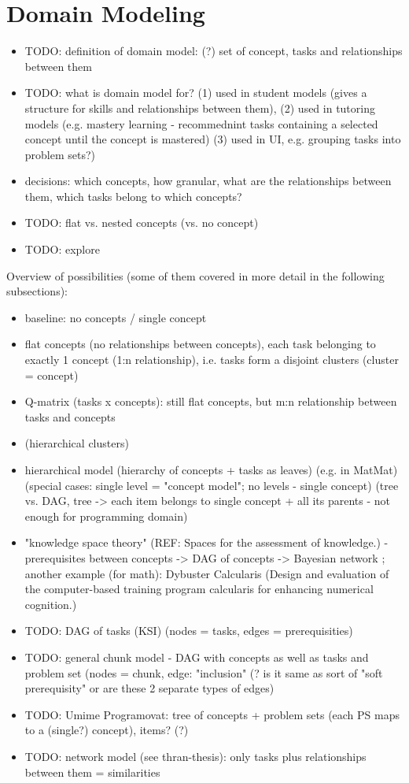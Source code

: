 \section{Domain Modeling}
\label{sec:domain-modeling}

\begin{itemize}
\item TODO: definition of domain model: (?) set of concept, tasks and relationships between them
\item TODO: what is domain model for?
  (1) used in student models (gives a structure for skills and relationships between them),
  (2) used in tutoring models (e.g. mastery learning - recommednint tasks containing a selected concept until the concept is mastered)
  (3) used in UI, e.g. grouping tasks into problem sets?)
\item decisions: which concepts, how granular, what are the relationships between them, which tasks belong to which concepts?
\item TODO: flat vs. nested concepts (vs. no concept)
\item TODO: explore \cite{rihak-phd}
\end{itemize}


Overview of possibilities
(some of them covered in more detail in the following subsections):
\begin{itemize}
\item baseline: no concepts / single concept
\item flat concepts (no relationships between concepts), each task belonging to exactly 1 concept (1:n relationship), i.e. tasks form a disjoint clusters (cluster = concept)
\item Q-matrix (tasks x concepts): still flat concepts, but m:n relationship between tasks and concepts
\item (hierarchical clusters)
\item hierarchical model (hierarchy of concepts + tasks as leaves) (e.g. in MatMat)
    (special cases: single level = "concept model"; no levels - single concept)
    (tree vs. DAG, tree -> each  item belongs to single concept + all its parents - not enough for programming domain)
\item "knowledge space theory" (REF: Spaces for the assessment of knowledge.) - prerequisites between concepts -> DAG of concepts -> Bayesian network \cite{its-programming}; another example (for math): Dybuster Calcularis (Design and evaluation of the computer-based training program calcularis for enhancing numerical cognition.)
\item TODO: DAG of tasks (KSI) (nodes = tasks, edges = prerequisities)
\item TODO: general chunk model - DAG with concepts as well as tasks and problem set (nodes = chunk, edge: "inclusion" (? is it same as sort of "soft prerequisity" or are these 2 separate types of edges)
\item TODO: Umime Programovat: tree of concepts + problem sets (each PS maps to a (single?) concept), items? (?)
\item TODO: network model (see thran-thesis): only tasks plus relationships between them = similarities
\end{itemize}


